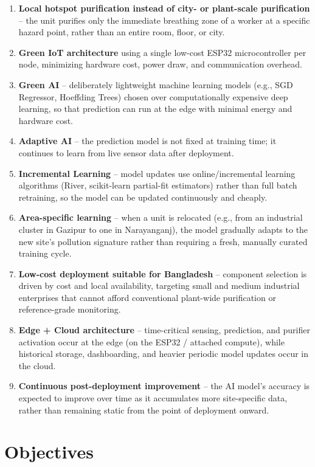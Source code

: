 \begin{enumerate}
    \item \textbf{Local hotspot purification instead of city- or plant-scale purification} -- the unit purifies only the immediate breathing zone of a worker at a specific hazard point, rather than an entire room, floor, or city.
    \item \textbf{Green IoT architecture} using a single low-cost ESP32 microcontroller per node, minimizing hardware cost, power draw, and communication overhead.
    \item \textbf{Green AI} -- deliberately lightweight machine learning models (e.g., SGD Regressor, Hoeffding Trees) chosen over computationally expensive deep learning, so that prediction can run at the edge with minimal energy and hardware cost.
    \item \textbf{Adaptive AI} -- the prediction model is not fixed at training time; it continues to learn from live sensor data after deployment.
    \item \textbf{Incremental Learning} -- model updates use online/incremental learning algorithms (River, scikit-learn partial-fit estimators) rather than full batch retraining, so the model can be updated continuously and cheaply.
    \item \textbf{Area-specific learning} -- when a unit is relocated (e.g., from an industrial cluster in Gazipur to one in Narayanganj), the model gradually adapts to the new site's pollution signature rather than requiring a fresh, manually curated training cycle.
    \item \textbf{Low-cost deployment suitable for Bangladesh} -- component selection is driven by cost and local availability, targeting small and medium industrial enterprises that cannot afford conventional plant-wide purification or reference-grade monitoring.
    \item \textbf{Edge + Cloud architecture} -- time-critical sensing, prediction, and purifier activation occur at the edge (on the ESP32 / attached compute), while historical storage, dashboarding, and heavier periodic model updates occur in the cloud.
    \item \textbf{Continuous post-deployment improvement} -- the AI model's accuracy is expected to improve over time as it accumulates more site-specific data, rather than remaining static from the point of deployment onward.
\end{enumerate}

\section{Objectives}
\label{sec:objectives}

